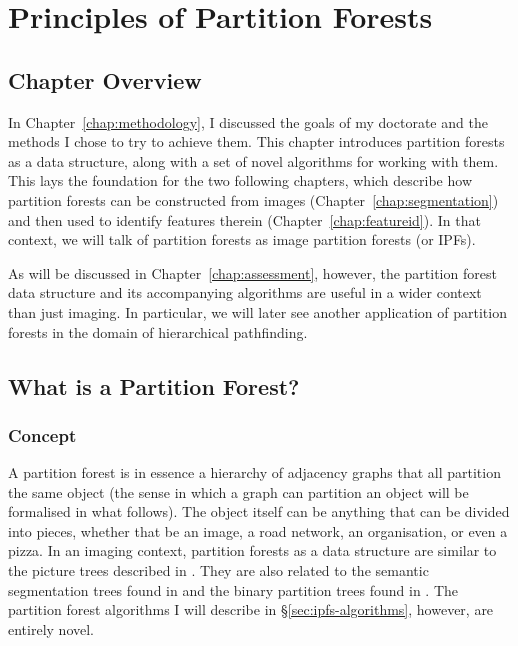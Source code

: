 \chapter{Principles of Partition Forests}
\label{chap:ipfs}

\section{Chapter Overview}

In Chapter~\ref{chap:methodology}, I discussed the goals of my doctorate and the methods I chose to try to achieve them. This chapter introduces partition forests as a data structure, along with a set of novel algorithms for working with them. This lays the foundation for the two following chapters, which describe how partition forests can be constructed from images (Chapter~\ref{chap:segmentation}) and then used to identify features therein (Chapter~\ref{chap:featureid}). In that context, we will talk of partition forests as image partition forests (or IPFs).

As will be discussed in Chapter~\ref{chap:assessment}, however, the partition forest data structure and its accompanying algorithms are useful in a wider context than just imaging. In particular, we will later see another application of partition forests in the domain of hierarchical pathfinding.

\section{What is a Partition Forest?}

\subsection{Concept}

A partition forest is in essence a hierarchy of adjacency graphs that all partition the same object (the sense in which a graph can partition an object will be formalised in what follows). The object itself can be anything that can be divided into pieces, whether that be an image, a road network, an organisation, or even a pizza. In an imaging context, partition forests as a data structure are similar to the picture trees described in \cite{andrade03}. They are also related to the semantic segmentation trees found in \cite{al-haj08} and the binary partition trees found in \cite{salembier00}. The partition forest algorithms I will describe in \S\ref{sec:ipfs-algorithms}, however, are entirely novel.

